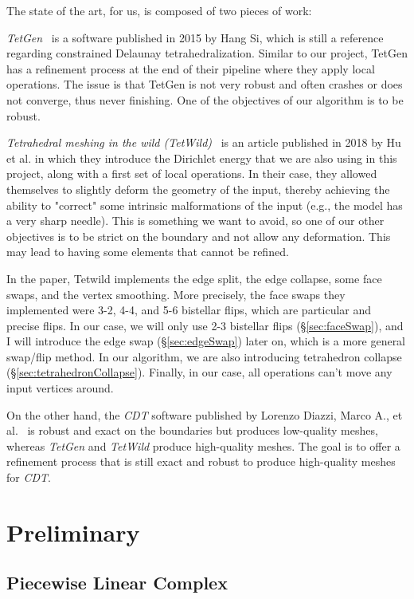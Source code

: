 \documentclass[11pt]{article}
\begin{document}
The state of the art, for us, is composed of two pieces of work:

\emph{TetGen}~\cite{si:tetgen} is a software published in 2015 by Hang Si, which is still a reference regarding constrained Delaunay tetrahedralization. Similar to our project, TetGen has a refinement process at the end of their pipeline where they apply local operations. The issue is that TetGen is not very robust and often crashes or does not converge, thus never finishing. One of the objectives of our algorithm is to be robust.

\emph{Tetrahedral meshing in the wild (TetWild)}~\cite{hu:tetwild} is an article published in 2018 by Hu et al. in which they introduce the Dirichlet energy that we are also using in this project, along with a first set of local operations. In their case, they allowed themselves to slightly deform the geometry of the input, thereby achieving the ability to "correct" some intrinsic malformations of the input (e.g., the model has a very sharp needle). This is something we want to avoid, so one of our other objectives is to be strict on the boundary and not allow any deformation. This may lead to having some elements that cannot be refined.

In the paper, Tetwild implements the edge split, the edge collapse, some face swaps, and the vertex smoothing. More precisely, the face swaps they implemented were 3-2, 4-4, and 5-6 bistellar flips, which are particular and precise flips. In our case, we will only use 2-3 bistellar flips (§\ref{sec:faceSwap}), and I will introduce the edge swap (§\ref{sec:edgeSwap}) later on, which is a more general swap/flip method. In our algorithm, we are also introducing tetrahedron collapse (§\ref{sec:tetrahedronCollapse}). Finally, in our case, all operations can't move any input vertices around.

On the other hand, the \emph{CDT} software published by Lorenzo Diazzi, Marco A., et al.~\cite{diazzi:cdt} is robust and exact on the boundaries but produces low-quality meshes, whereas \emph{TetGen} and \emph{TetWild} produce high-quality meshes. The goal is to offer a refinement process that is still exact and robust to produce high-quality meshes for \emph{CDT}.



\section{Preliminary}

\subsection{Piecewise Linear Complex}
\end{document}
